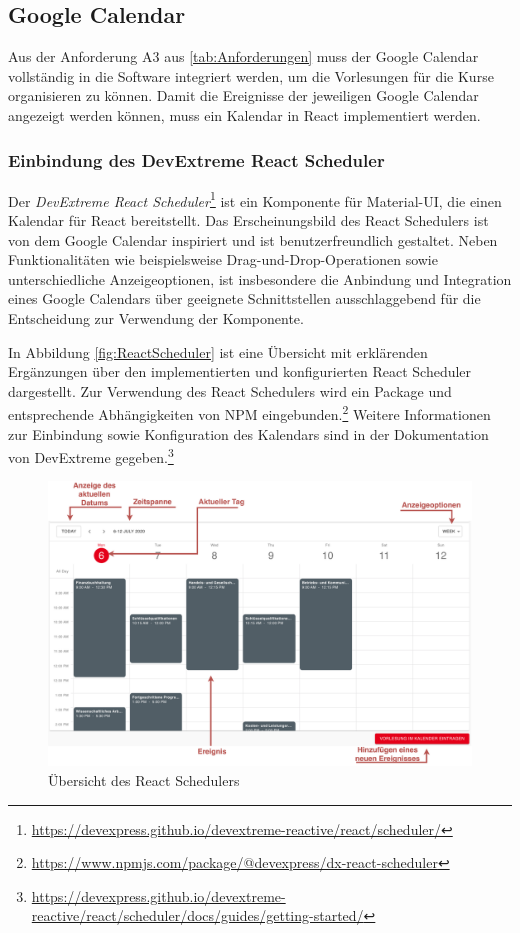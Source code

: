\subsection{Google Calendar}

Aus der Anforderung A3 aus \vref{tab:Anforderungen} muss der Google Calendar vollständig in die Software integriert werden, um die Vorlesungen für die Kurse organisieren zu können. 
Damit die Ereignisse der jeweiligen Google Calendar angezeigt werden können, muss ein Kalendar in React implementiert werden. 

\subsubsection{Einbindung des DevExtreme React Scheduler}
Der \textit{DevExtreme React Scheduler}\footnote{\url{https://devexpress.github.io/devextreme-reactive/react/scheduler/}} ist ein Komponente für Material-UI, die einen Kalendar für React bereitstellt. 
Das Erscheinungsbild des React Schedulers ist von dem Google Calendar inspiriert und ist benutzerfreundlich gestaltet.\autocite[Vgl.][]{ReactScheduler} 
Neben Funktionalitäten wie beispielsweise Drag-und-Drop-Operationen sowie unterschiedliche Anzeigeoptionen, ist insbesondere die Anbindung und Integration eines Google Calendars über geeignete Schnittstellen ausschlaggebend für die Entscheidung zur Verwendung der Komponente. 

In Abbildung \vref{fig:ReactScheduler} ist eine Übersicht mit erklärenden Ergänzungen über den implementierten und konfigurierten React Scheduler dargestellt. 
Zur Verwendung des React Schedulers wird ein Package und entsprechende Abhängigkeiten von NPM eingebunden.\footnote{\url{https://www.npmjs.com/package/@devexpress/dx-react-scheduler}}
Weitere Informationen zur Einbindung sowie Konfiguration des Kalendars sind in der Dokumentation von DevExtreme gegeben.\footnote{\url{https://devexpress.github.io/devextreme-reactive/react/scheduler/docs/guides/getting-started/}}
\begin{figure}[H]
	\centering 
	\includegraphics[width=\textwidth]{img/FrontEnd/ReactCalendar.pdf}
	\caption[Übersicht des React Schedulers]{\label{fig:ReactScheduler}Übersicht des React Schedulers\footnotemark}
\end{figure}

